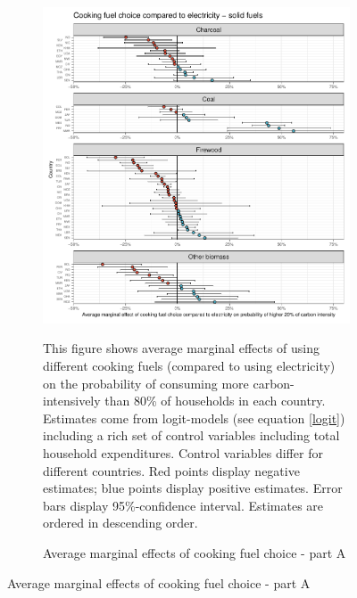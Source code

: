  \begin{figure}[ht!]\ContinuedFloat
   \centering
   \begin{subfigure}[b]{\textwidth}
   \centering
   \includegraphics{1_Figures/Analysis_Logit_Models_Marginal_Effects/Average_Marginal_Effects_affected_upper_80_CF_Electricity A_2017B.pdf}
   \caption{Average marginal effects of cooking fuel choice - part A} \label{fig:Logit_ME_CF_1}
   \begin{subcaption2}
     This figure shows average marginal effects of using different cooking fuels (compared to using electricity) on the probability of consuming more carbon-intensively than 80\% of households in each country. Estimates come from logit-models (see equation \ref{logit}) including a rich set of control variables including total household expenditures. Control variables differ for different countries. Red points display negative estimates; blue points display positive estimates. Error bars display 95\%-confidence interval. Estimates are ordered in descending order.
   \end{subcaption2}
   \end{subfigure}
 \end{figure}
 \clearpage


